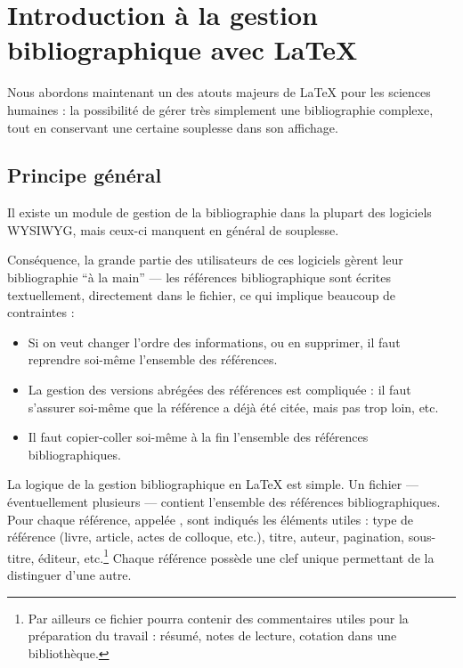 \chapter[Introduction]{Introduction à la gestion bibliographique avec \LaTeX{}}
\begin{intro}
Nous abordons maintenant un des atouts majeurs de \LaTeX{} pour les sciences humaines : la possibilité de gérer très simplement une bibliographie complexe, tout en conservant une certaine souplesse dans son affichage.

\end{intro}
\section{Principe général}



Il existe un module de gestion de la bibliographie dans la plupart des logiciels WYSIWYG, mais ceux-ci manquent en général de souplesse.

Conséquence, la grande partie des utilisateurs de ces logiciels gèrent leur bibliographie \enquote{à la main} --- les références bibliographique sont écrites textuellement, directement dans le fichier, ce qui implique beaucoup de contraintes  :
\begin{itemize}
\item Si on veut changer l'ordre des informations, ou en supprimer, il faut reprendre soi-même l'ensemble des références.
\item La gestion des versions abrégées des références est  compliquée :  il faut s'assurer soi-même que la référence a déjà été citée, mais pas trop loin, etc. 
\item Il faut copier-coller soi-même à la fin l'ensemble des références bibliographiques. 
\end{itemize}

La logique de la gestion bibliographique en \LaTeX{} est  simple. Un fichier   --- éventuellement plusieurs --- contient l'ensemble des références bibliographiques. Pour chaque référence, appelée , sont indiqués les éléments utiles :  type de référence (livre, article, actes de colloque, etc.), titre, auteur, pagination, sous-titre, éditeur, etc.\footnote{Par ailleurs ce fichier pourra contenir des commentaires utiles pour la préparation du travail : résumé, notes de lecture, cotation dans une bibliothèque.} Chaque référence possède une clef unique permettant de la distinguer d'une autre.

